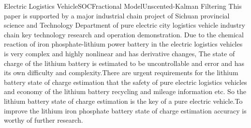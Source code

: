 
\begin{Eabstract}{Electric Logistics Vehicle}{SOC}{Fractional Model}{Unscented-Kalman Filtering}{}
This paper is supported by a major industrial chain project of Sichuan provincial science and Technology Department of pure electric city logistics vehicle industry chain key technology research and operation demonstration. Due to the chemical reaction of iron phosphate-lithium power battery in the electric logistics vehicles is very complex and highly nonlinear and has derivative changes, The state of charge of the lithium battery is estimated to be uncontrollable and error and has its own difficulty and complexity.There are urgent requirements for the lithium battery state of charge estimation that the safety of pure electric logistics vehicles and economy of  the lithium battery recycling and mileage information etc. So the lithium battery state of charge estimation is the key of a pure electric vehicle.To improve the lithium iron phosphate battery state of charge estimation accuracy is worthy of further research.


\end{Eabstract}
